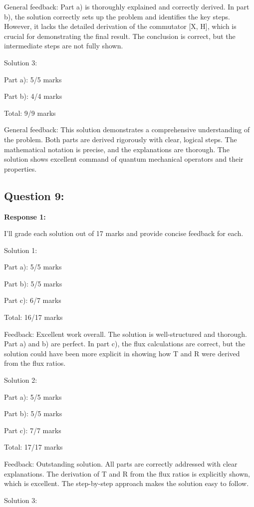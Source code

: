 \documentclass[a4paper,11pt]{article}
\begin{document}
General feedback: Part a) is thoroughly explained and correctly derived. In part b), the solution correctly sets up the problem and identifies the key steps. However, it lacks the detailed derivation of the commutator [X, H], which is crucial for demonstrating the final result. The conclusion is correct, but the intermediate steps are not fully shown.

Solution 3:

Part a): 5/5 marks

Part b): 4/4 marks

Total: 9/9 marks

General feedback: This solution demonstrates a comprehensive understanding of the problem. Both parts are derived rigorously with clear, logical steps. The mathematical notation is precise, and the explanations are thorough. The solution shows excellent command of quantum mechanical operators and their properties.


\subsection*{Question 9:}

\textbf{Response 1:}

I'll grade each solution out of 17 marks and provide concise feedback for each.

Solution 1:

Part a): 5/5 marks

Part b): 5/5 marks

Part c): 6/7 marks

Total: 16/17 marks

Feedback: Excellent work overall. The solution is well-structured and thorough. Part a) and b) are perfect. In part c), the flux calculations are correct, but the solution could have been more explicit in showing how T and R were derived from the flux ratios.

Solution 2:

Part a): 5/5 marks

Part b): 5/5 marks

Part c): 7/7 marks

Total: 17/17 marks

Feedback: Outstanding solution. All parts are correctly addressed with clear explanations. The derivation of T and R from the flux ratios is explicitly shown, which is excellent. The step-by-step approach makes the solution easy to follow.

Solution 3:
\end{document}
